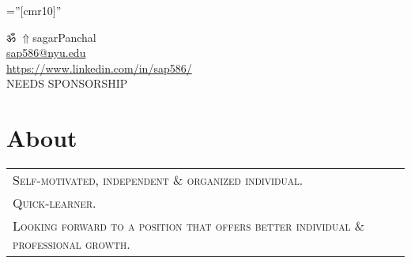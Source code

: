 \documentclass[a4paper]{article}
\newcommand{\apple}{\char"F8FF}
\begin{document}
\pagestyle{empty} 						%
\font\fb=''[cmr10]'' 						%

\par	{\centering
	ॐ
	\href{https://sap586.github.io/LivingSpace/}{$ \Uparrow$}{sagarPanchal}								\\
	\small \href{mailto:sap586@nyu.edu}{sap586@nyu.edu}			
															\\
	\small \href{https://www.linkedin.com/in/sap586/}{https://www.linkedin.com/in/sap586/}				\\
	\small NEEDS SPONSORSHIP																			\par}
	
\section	{	About		}

	\begin{tabular}{lr}
		\textsc{	Self-motivated, independent \& organized individual.										}\\
		\textsc{	Quick-learner.																				}\\
		\textsc{	Looking forward to a position that offers better individual \& professional growth.			}
	\end{tabular}
	\begin{spacing}{0.4}
	\end{spacing}

	
%
\end{document}
